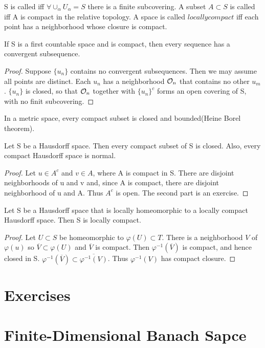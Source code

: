 \begin{definition}
S is called  iff $\forall \cup_\alpha U_\alpha = S$ there is a finite subcovering. A subset $A\subset S$ is called 
iff A is compact in the relative topology. A space is called $locally compact$ iff each point has a neighborhood whose closure is compact.
\end{definition}
\begin{thm}
If S is a first countable space and is compact, then every sequence has a convergent subsequence.
\end{thm}
\begin{proof}
Suppose $\{u_n\}$ contains no convergent subsequences. Then we may assume all points are distinct. Each $u_n$ has a neighborhood $\mathcal{O}_n$
that contains no other $u_m$. $\{u_n\}$ is closed, so that $\mathcal{O}_n$ together with $\{u_n\}^c$ forms an open covering of S, with no finit subcovering.
\end{proof}
In a metric space, every compact subset is closed and bounded(Heine Borel theorem).
\begin{prop}
Let S be a Hausdorff space. Then every compact subset of S is closed. Also, every compact Hausdorff space is normal.
\end{prop}
\begin{proof}
Let $u\in A^c$ and $v\in A$, where A is compact in S. There are disjoint neighborhoods of u and v and, since A is compact, there are disjoint 
neighborhood of u and A. Thus $A^c$ is open. The second part is an exercise.
\end{proof}
\begin{prop}
Let S be a Hausdorff space that is locally homeomorphic to a locally compact Hausdorff space. Then S is locally compact.
\end{prop}
\begin{proof}
Let $U\subset S$ be homeomorphic to $\varphi(U)\subset T$. There is a neighborhood $V$ of $\varphi(u)$ so $\overline{V}\subset \varphi(U)$ and
$\overline{V}$ is compact. Then $\varphi^{-1}(\overline{V})$ is compact, and hence closed in S. $\varphi^{-1}(\overline{V})\subset 
\overline{\varphi^{-1}(V)}$. Thus $\varphi^{-1}(V)$ has compact closure.
\end{proof}
\section*{Exercises}
\section{Finite-Dimensional Banach Sapce}
